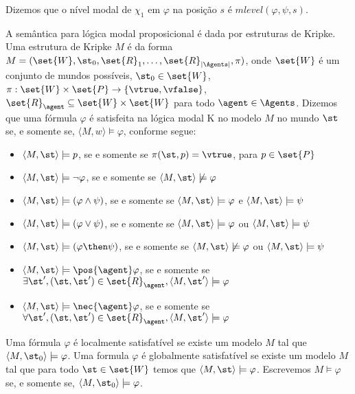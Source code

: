 Dizemos que o nível modal de $\chi_1$ em $\varphi$ na posição $s$ é $mlevel(\varphi, \psi, s)$.

A semântica para lógica modal proposicional é dada por estruturas de Kripke. Uma estrutura de Kripke $M$ é da forma $M = (\set{W}, \st_0, \set{R}_1, \ldots, \set{R}_{|\Agents|}, \pi)$, onde %
$\set{W}$ é um conjunto de mundos possíveis, $\st_0 \in \set{W}$, $\pi:\set{W} \times \set{P} \rightarrow \{\vtrue, \vfalse\}$, $\set{R}_\agent \subseteq \set{W} \times \set{W}$ para todo $\agent \in \Agents$. Dizemos que uma fórmula $\varphi$ é satisfeita na lógica modal K no modelo $M$ no mundo $\st$ se, e somente se, $\langle M,w \rangle \models \varphi$, conforme segue:

\begin{itemize}
	\item $\langle M,\st \rangle \models p$, se e somente se $\pi(\st, p) = \vtrue$, para $p \in \set{P}$
	\item $\langle M,\st \rangle \models \neg\varphi$, se e somente se $\langle M,\st \rangle \not\models \varphi$
	\item $\langle M,\st \rangle \models (\varphi \land \psi)$, se e somente se $\langle M,\st \rangle \models \varphi$ e $\langle M,\st \rangle \models \psi$
	\item $\langle M,\st \rangle \models (\varphi \lor \psi)$, se e somente se $\langle M,\st \rangle \models \varphi$ ou $\langle M,\st \rangle \models \psi$
	\item $\langle M,\st \rangle \models (\varphi \then \psi)$, se e somente se $\langle M,\st \rangle \not\models \varphi$ ou $\langle M,\st \rangle \models \psi$
	
	\item $\langle M,\st \rangle \models \pos{\agent}\varphi$, se e somente se $\exists\st', (\st, \st') \in \set{R}_\agent, \langle M,\st' \rangle \models \varphi$
	\item $\langle M,\st \rangle \models \nec{\agent}\varphi$, se e somente se $\forall\st', (\st, \st') \in \set{R}_\agent, \langle M,\st' \rangle \models \varphi$
	
\end{itemize}

Uma fórmula $\varphi$ é localmente satisfatível se existe um modelo $M$ tal que $\langle M,\st_0 \rangle \models \varphi$. Uma formula $\varphi$ é globalmente satisfatível se existe um modelo $M$ tal que para todo $\st \in \set{W}$ temos que $\langle M,\st \rangle \models \varphi$. Escrevemos $M \models \varphi$ se, e somente se, $\langle M, \st_0 \rangle \models \varphi$.

